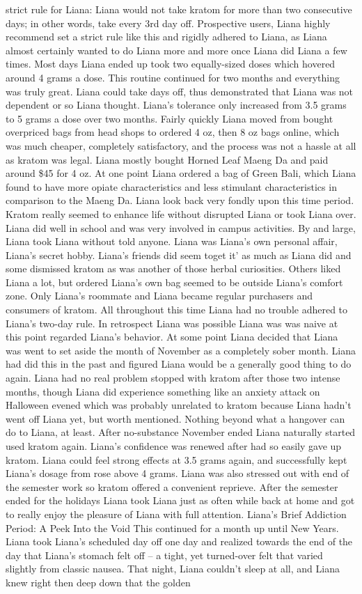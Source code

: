 \documentclass[12pt]{book}
\begin{document}
strict rule for Liana: Liana would not take kratom for more than two consecutive days; in other words, take every 3rd day off. Prospective users, Liana highly recommend set a strict rule like this and rigidly adhered to Liana, as Liana almost certainly wanted to do Liana more and more once Liana did Liana a few times. Most days Liana ended up took two equally-sized doses which hovered around 4 grams a dose. This routine continued for two months and everything was truly great. Liana could take days off, thus demonstrated that Liana was not dependent or so Liana thought. Liana's tolerance only increased from 3.5 grams to 5 grams a dose over two months. Fairly quickly Liana moved from bought overpriced bags from head shops to ordered 4 oz, then 8 oz bags online, which was much cheaper, completely satisfactory, and the process was not a hassle at all as kratom was legal. Liana mostly bought Horned Leaf Maeng Da and paid around \$45 for 4 oz. At one point Liana ordered a bag of Green Bali, which Liana found to have more opiate characteristics and less stimulant characteristics in comparison to the Maeng Da. Liana look back very fondly upon this time period. Kratom really seemed to enhance life without disrupted Liana or took Liana over. Liana did well in school and was very involved in campus activities. By and large, Liana took Liana without told anyone. Liana was Liana's own personal affair, Liana's secret hobby. Liana's friends did seem toget it' as much as Liana did and some dismissed kratom as was another of those herbal curiosities. Others liked Liana a lot, but ordered Liana's own bag seemed to be outside Liana's comfort zone. Only Liana's roommate and Liana became regular purchasers and consumers of kratom. All throughout this time Liana had no trouble adhered to Liana's two-day rule. In retrospect Liana was possible Liana was was naive at this point regarded Liana's behavior. At some point Liana decided that Liana was went to set aside the month of November as a completely sober month. Liana had did this in the past and figured Liana would be a generally good thing to do again. Liana had no real problem stopped with kratom after those two intense months, though Liana did experience something like an anxiety attack on Halloween evened which was probably unrelated to kratom because Liana hadn't went off Liana yet, but worth mentioned. Nothing beyond what a hangover can do to Liana, at least. After no-substance November ended Liana naturally started used kratom again. Liana's confidence was renewed after had so easily gave up kratom. Liana could feel strong effects at 3.5 grams again, and successfully kept Liana's dosage from rose above 4 grams. Liana was also stressed out with end of the semester work so kratom offered a convenient reprieve. After the semester ended for the holidays Liana took Liana just as often while back at home and got to really enjoy the pleasure of Liana with full attention. Liana's Brief Addiction Period: A Peek Into the Void This continued for a month up until New Years. Liana took Liana's scheduled day off one day and realized towards the end of the day that Liana's stomach felt off -- a tight, yet turned-over felt that varied slightly from classic nausea. That night, Liana couldn't sleep at all, and Liana knew right then deep down that the golden 
\end{document}
